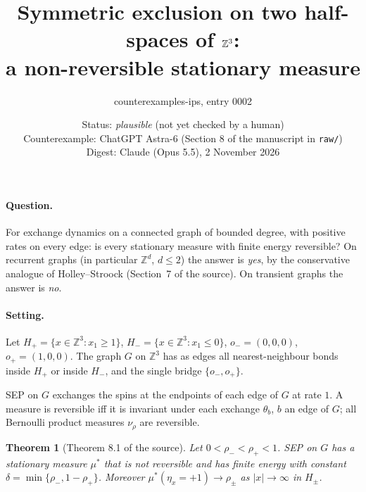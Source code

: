 \documentclass[11pt]{article}
\title{Symmetric exclusion on two half-spaces of $\Z^3$:\\ a non-reversible stationary measure}
\author{counterexamples-ips, entry 0002}
\date{Status: \emph{plausible} (not yet checked by a human)\\[2pt]\small Counterexample: ChatGPT Astra-6 (Section 8 of the manuscript in \texttt{raw/})\\ Digest: Claude (Opus 5.5), 2 November 2026}
\newtheorem{theorem}{Theorem}
\theoremstyle{remark}\newtheorem*{remark}{Remark}
\newcommand{\Z}{\mathbb{Z}}
\begin{document}
\maketitle

\paragraph{Question.} For exchange dynamics on a connected graph of bounded degree, with positive rates on every edge: is every stationary measure with finite energy reversible? On recurrent graphs (in particular $\Z^d$, $d\le2$) the answer is \emph{yes}, by the conservative analogue of Holley--Stroock (Section~7 of the source). On transient graphs the answer is \emph{no}.

\paragraph{Setting.} Let $H_+=\{x\in\Z^3:x_1\ge1\}$, $H_-=\{x\in\Z^3:x_1\le0\}$, $o_-=(0,0,0)$, $o_+=(1,0,0)$. The graph $G$ on $\Z^3$ has as edges all nearest-neighbour bonds inside $H_+$ or inside $H_-$, and the single bridge $\{o_-,o_+\}$.

\begin{center}
\end{center}

SEP on $G$ exchanges the spins at the endpoints of each edge of $G$ at rate $1$. A measure is reversible iff it is invariant under each exchange $\theta_b$, $b$ an edge of $G$; all Bernoulli product measures $\nu_\rho$ are reversible.

\begin{theorem}[Theorem 8.1 of the source]
Let $0<\rho_-<\rho_+<1$. SEP on $G$ has a stationary measure $\mu^*$ that is not reversible and has finite energy with constant $\delta=\min\{\rho_-,1-\rho_+\}$. Moreover $\mu^*(\eta_x=+1)\to\rho_\pm$ as $|x|\to\infty$ in $H_\pm$.
\end{theorem}
\end{document}
